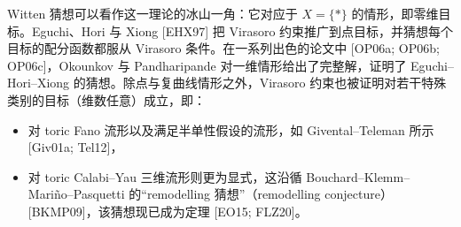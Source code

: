 Witten 猜想可以看作这一理论的冰山一角：它对应于 $X=\{*\}$ 的情形，即零维目标。Eguchi、Hori 与 Xiong [EHX97] 把 Virasoro 约束推广到点目标，并猜想每个目标的配分函数都服从 Virasoro 条件。在一系列出色的论文中 [OP06a; OP06b; OP06c]，Okounkov 与 Pandharipande 对一维情形给出了完整解，证明了 Eguchi--Hori--Xiong 的猜想。除点与复曲线情形之外，Virasoro 约束也被证明对若干特殊类别的目标（维数任意）成立，即：
\begin{itemize}
  \item 对 toric Fano 流形以及满足半单性假设的流形，如 Givental--Teleman 所示 [Giv01a; Tel12]，
  \item 对 toric Calabi--Yau 三维流形则更为显式，这沿循 Bouchard--Klemm--Mari\~no--Pasquetti 的“remodelling 猜想”（remodelling conjecture）[BKMP09]，该猜想现已成为定理 [EO15; FLZ20]。
\end{itemize}
